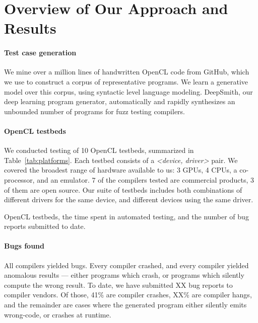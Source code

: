 \section{Overview of Our Approach and Results}\label{sec:overview}


\paragraph{Test case generation} We mine over a million lines of handwritten OpenCL code from GitHub, which we use to construct a corpus of representative programs. We learn a generative model over this corpus, using syntactic level language modeling. DeepSmith, our deep learning program generator, automatically and rapidly synthesizes an unbounded number of programs for fuzz testing compilers.

\paragraph{OpenCL testbeds} We conducted testing of 10 OpenCL testbeds, summarized in Table~\ref{tab:platforms}. Each testbed consists of a \emph{<device, driver>} pair. We covered the broadest range of hardware available to us: 3 GPUs, 4 CPUs, a co-processor, and an emulator. 7 of the compilers tested are commercial products, 3 of them are open source. Our suite of testbeds includes both combinations of different drivers for the same device, and different devices using the same driver.


\begin{table*}[t!]
	\scriptsize %
	\centering %
	
	\caption{OpenCL testbeds, the time spent in automated testing, and the number of bug reports submitted to date.}
	\label{tab:platforms}
\end{table*}


\paragraph{Bugs found} All compilers yielded bugs. Every compiler crashed, and every compiler yielded anomalous results --- either programs which crash, or programs which silently compute the wrong result. To date, we have submitted XX bug reports to compiler vendors. Of those, 41\% are compiler crashes, XX\% are compiler hangs, and the remainder are cases where the generated program either silently emits wrong-code, or crashes at runtime. 